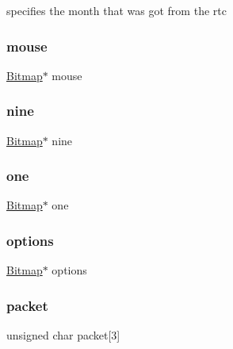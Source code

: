 specifies the month that was got from the rtc 

\mbox{\label{struct_game_a3c44e12d021ee83fe192c72582559ae5}} 
\subsubsection{\texorpdfstring{mouse}{mouse}}
{\footnotesize\ttfamily \hyperlink{struct_bitmap}{Bitmap}$\ast$ mouse}

\mbox{\label{struct_game_a7991e77893cb1df475d8f5486a9fccc9}} 
\subsubsection{\texorpdfstring{nine}{nine}}
{\footnotesize\ttfamily \hyperlink{struct_bitmap}{Bitmap}$\ast$ nine}

\mbox{\label{struct_game_a80e7bcf01a03e735a1c2ac42a1edbdf5}} 
\subsubsection{\texorpdfstring{one}{one}}
{\footnotesize\ttfamily \hyperlink{struct_bitmap}{Bitmap}$\ast$ one}

\mbox{\label{struct_game_aa6717db7288a48453552a20746f11644}} 
\subsubsection{\texorpdfstring{options}{options}}
{\footnotesize\ttfamily \hyperlink{struct_bitmap}{Bitmap}$\ast$ options}

\mbox{\label{struct_game_a1d1878244696a8be772aa71772c33f0a}} 
\subsubsection{\texorpdfstring{packet}{packet}}
{\footnotesize\ttfamily unsigned char packet\mbox{[}3\mbox{]}}



